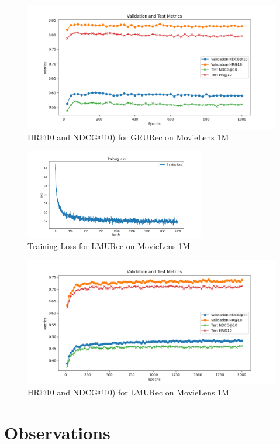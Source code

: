 \documentclass{article}
\begin{document}
\begin{figure}
    \centering
    \includegraphics[width=0.7\linewidth]{plots/GRURec_ml-1m_metrics.png}
    \caption{HR@10 and NDCG@10) for GRURec on MovieLens 1M}
    \label{fig:enter-label}
\end{figure}


\begin{figure}[h!]
    \centering
    \includegraphics[width=0.7\textwidth]{plots/LMURec_ml-1m_training_loss.png}
    
    \caption{Training Loss for LMURec on MovieLens 1M}
    \label{fig:sasrec_loss}
\end{figure}

\begin{figure}
    \centering
    \includegraphics[width=0.7\linewidth]{plots/LMURec_ml-1m_metrics.png}
    \caption{HR@10 and NDCG@10) for LMURec on MovieLens 1M}
    \label{fig:enter-label}
\end{figure}


\section{Observations}
\end{document}
